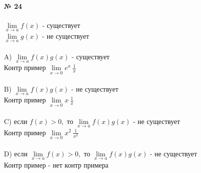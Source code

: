 \documentclass{article}
\begin{document}
\textbf{№ 24}
\\
\\
$ \lim\limits_{x\to a} f(x) $ - существует \\
$ \lim\limits_{x\to a} g(x) $ - не существует
\\
\\
A) $ \lim\limits_{x\to a} f(x) g(x) $ - существует
\\
Контр пример $ \lim\limits_{x\to 0} e^x \ \frac{1}{x} $
\\
\\
B) $ \lim\limits_{x\to a} f(x) g(x) $ - не существует
\\
Контр пример $ \lim\limits_{x\to 0} x \ \frac{1}{x} $
\\
\\
C) если $f(x) > 0, $ то $ \lim\limits_{x\to a} f(x) g(x) $ - не существует
\\
Контр пример $ \lim\limits_{x\to 0} x^2 \ \frac{1}{x^2} $
\\
\\
D) если $ \lim\limits_{x\to a} f(x) > 0, $ то $ \lim\limits_{x\to a} f(x) g(x) $ - не существует
\\
Контр пример - нет контр примера
\end{document}
